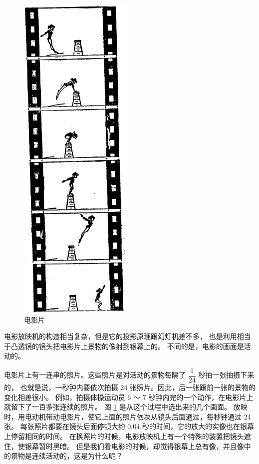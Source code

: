 \begin{figure}
    \centering
    \includegraphics[width=5.5cm]{../pic/czwl2-ch1-31}
    \caption{电影片}\label{fig:1-31}
\end{figure}


电影放映机的构造相当复杂，但是它的投影原理跟幻灯机差不多，
也是利用相当于凸透镜的镜头把电影片上景物的像射到银幕上的。
不同的是，电影的画面是活动的。

电影片上有一连串的照片。这些照片是对活动的景物每隔了 $\dfrac{1}{24}$ 秒拍一张拍摄下来的，
也就是说，一秒钟内要依次拍摄 24 张照片。因此，后一张跟前一张的景物的变化相差很小。
例如，拍摄体操运动员 6 ～ 7 秒钟内完的一个动作，在电影片上就留下了一百多张连续的照片。
图 \ref{fig:1-31} 是从这个过程中选出来的几个画面。
放映时，用电动机带动电影片，使它上面的照片依次从镜头后面通过，每秒钟通过 24 张。
每张照片都要在镜头后面停顿大约 0.04 秒的时间，它的放大的实像也在银幕上停留相同的时间。
在换照片的时候，电影放映机上有一个特殊的装置把镜头遮住，使银幕暂时黑暗。
但是我们看电影的时候，却觉得银幕上总有像，并且像中的景物是连续活动的，这是为什么呢？

